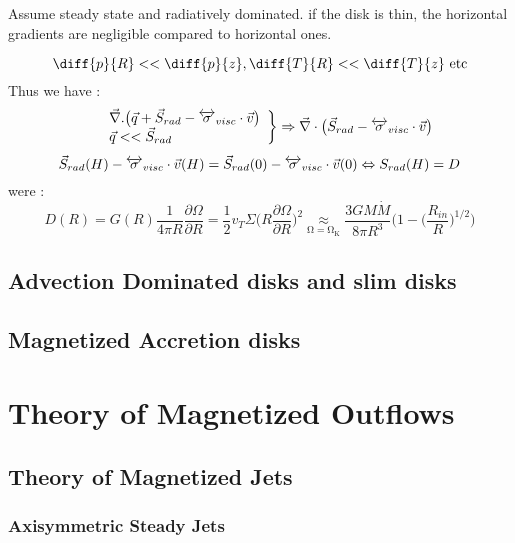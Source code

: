 \documentclass[10pt,a4paper,english,draft]{article}
\let\originalleft\left
\let\originalright\right
\renewcommand{\left}{\mathopen{}\mathclose\bgroup\originalleft}
\renewcommand{\right}{\aftergroup\egroup\originalright}
\begin{document}
Assume steady state and radiatively dominated. if the disk is thin, the horizontal gradients
are negligible compared to horizontal ones.

\begin{equation}	
\diff{p}{R} << \diff{p}{z}, \diff{T}{R} << \diff{T}{z}\text{  etc}
\end{equation}
Thus we have : 
\begin{equation}
 \left.
    \begin{array}{ll}
        & \vec{\nabla}.\big( \vec{q}+\vec{S}_{rad}-\tens{\sigma}_{visc}\cdot\vec{v}\big)\\
        & \vec{q} << \vec{S}_{rad}
    \end{array}
\right \}\Rightarrow \vec{\nabla}\cdot\big(\vec{S}_{rad}-\tens{\sigma}_{visc}\cdot\vec{v}\big) 
\end{equation}
\begin{equation}
\vec{S}_{rad}(H) - \overleftrightarrow{\sigma}_{visc}\cdot\vec{v}(H) = \vec{S}_{rad}(0) - \overleftrightarrow{\sigma}_{visc}\cdot\vec{v}(0) \Leftrightarrow
S_{rad}(H) = D
\end{equation}
were : 
\begin{equation}
D(R) = G(R)\frac{1}{4\pi R}\frac{\partial \Omega}{\partial R } = 
\frac{1}{2}v_T \Sigma\bigg(   R\frac{\partial \Omega}{\partial R }\bigg)^2 \underset{\mathrm{\Omega = \Omega_K}}{\approx}
\frac{3GM\dot{M}}{8\pi R^3}\Bigg( 1-\bigg(\frac{R_{in}}{R}\bigg)^{1/2}\Bigg)
\end{equation}





\subsection{Advection Dominated disks and slim disks}
\subsection{Magnetized Accretion disks}

\section{Theory of Magnetized Outflows}
\subsection{Theory of Magnetized Jets}
\subsubsection{Axisymmetric Steady Jets}
\end{document}
